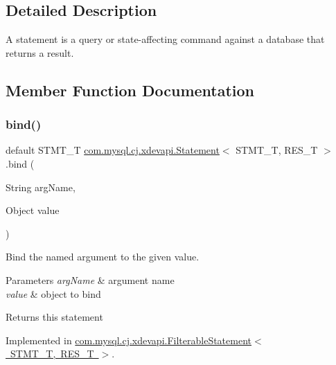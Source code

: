 \subsection{Detailed Description}
A statement is a query or state-\/affecting command against a database that returns a result. 

\subsection{Member Function Documentation}
\mbox{\label{interfacecom_1_1mysql_1_1cj_1_1xdevapi_1_1_statement_ad4a21af767982f02e50d244b705ee24b}} 
\subsubsection{\texorpdfstring{bind()}{bind()}\hspace{0.1cm}{\footnotesize\ttfamily [1/4]}}
{\footnotesize\ttfamily default S\+T\+M\+T\+\_\+T \mbox{\hyperlink{interfacecom_1_1mysql_1_1cj_1_1xdevapi_1_1_statement}{com.\+mysql.\+cj.\+xdevapi.\+Statement}}$<$ S\+T\+M\+T\+\_\+T, R\+E\+S\+\_\+T $>$.bind (\begin{DoxyParamCaption}\item[{String}]{arg\+Name,  }\item[{Object}]{value }\end{DoxyParamCaption})}

Bind the named argument to the given value.


\begin{DoxyParams}{Parameters}
{\em arg\+Name} & argument name \\
\hline
{\em value} & object to bind \\
\hline
\end{DoxyParams}
\begin{DoxyReturn}{Returns}
this statement 
\end{DoxyReturn}


Implemented in \mbox{\hyperlink{classcom_1_1mysql_1_1cj_1_1xdevapi_1_1_filterable_statement_af9ccf97ebcaf88f6f9317829bf8496cb}{com.\+mysql.\+cj.\+xdevapi.\+Filterable\+Statement$<$ S\+T\+M\+T\+\_\+\+T, R\+E\+S\+\_\+\+T $>$}}.

\mbox{\label{interfacecom_1_1mysql_1_1cj_1_1xdevapi_1_1_statement_a4541c17d970821bc7dd87beec7e5d0a1}} 
